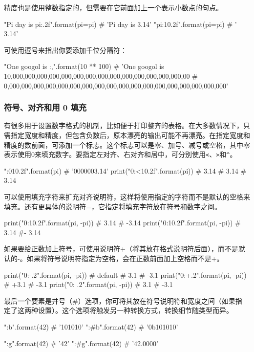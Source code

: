 精度也是使用整数指定的，但需要在它前面加上一个表示小数点的句点。
\begin{pyc}
"Pi day is {pi:.2f}".format(pi=pi)  # 'Pi day is 3.14'
"{pi:10.2f}".format(pi=pi)  # '      3.14'
\end{pyc}

可使用逗号来指出你要添加千位分隔符：
\begin{pyc}
"One googol is {:,}".format(10 ** 100)
# 'One googol is 10,000,000,000,000,000,000,000,000,000,000,000,000,000,000,00
# 0,000,000,000,000,000,000,000,000,000,000,000,000,000,000,000,000,000,000'
\end{pyc}
\subsubsection{符号、对齐和用 0 填充}
有很多用于设置数字格式的机制，比如便于打印整齐的表格。在大多数情况下，只需指定宽度和精度，但包含负数后，原本漂亮的输出可能不再漂亮。在指定宽度和精度的数前面，可添加一个标志。这个标志可以是零、加号、减号或空格，其中零表示使用0来填充数字。要指定左对齐、右对齐和居中，可分别使用\verb|<|、\verb|>|和\verb|^|。
\begin{pyc}
"{:010.2f}".format(pi)  # '0000003.14'
print("{0:<10.2f}".format(pi))
# 3.14      
#    3.14   
#       3.14
\end{pyc}
可以使用填充字符来扩充对齐说明符，这样将使用指定的字符而不是默认的空格来填充。还有更具体的说明符=，它指定将填充字符放在符号和数字之间。
\begin{pyc}
print("{0:10.2f}".format(pi, -pi))
#      3.14
#     -3.14
print("{0:10.2f}".format(pi, -pi))
#      3.14
#-     3.14
\end{pyc}

如果要给正数加上符号，可使用说明符+（将其放在格式说明符后面），而不是默认的-。如果将符号说明符指定为空格，会在正数前面加上空格而不是+。
\begin{pyc}
print("{0:-.2}".format(pi, -pi))  # default
# 3.1
# -3.1
print("{0:+.2}".format(pi, -pi))
# +3.1
# -3.1
print("{0: .2}".format(pi, -pi))
#  3.1
# -3.1
\end{pyc}

最后一个要素是井号（\#）选项，你可将其放在符号说明符和宽度之间（如果指
定了这两种设置）。这个选项将触发另一种转换方式，转换细节随类型而异。
\begin{pyc}
"{:b}".format(42)  # '101010'
"{:#b}".format(42)  # '0b101010'

"{:g}".format(42)  # '42'
"{:#g}".format(42)  # '42.0000'
\end{pyc}

